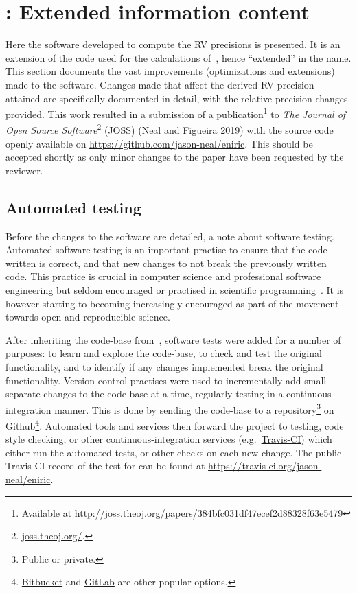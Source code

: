 
\section{\eniric{}: Extended \nir{} information content}
\label{sec:eniric}
Here the software developed to compute the {RV} precisions is presented.
It is an extension of the code used for the calculations of~\citet{figueira_radial_2016}, hence ``extended'' in the name.
This section documents the vast improvements (optimizations and extensions) made to the software.
Changes made that affect the derived {RV} precision attained are specifically documented in detail, with the relative precision changes provided.
This work resulted in a submission of a publication\footnote{Available at \href{http://joss.theoj.org/papers/384bfc031df47ecef2d88328f63e5479}{http://joss.theoj.org/papers/384bfc031df47ecef2d88328f63e5479}} to \emph{The Journal of Open Source Software}\footnote{\href{http://joss.theoj.org/}{joss.theoj.org/}.} (JOSS) (Neal and Figueira 2019) with the source code openly available on \href{Github}{https://github.com/jason-neal/eniric}.
This should be accepted shortly as only minor changes to the paper have been requested by the reviewer.


\subsection{Automated testing}
\label{subsec:automated_testing}
Before the changes to the software are detailed, a note about software testing.
Automated software testing is an important practise to ensure that the code written is correct, and that new changes to not break the previously written code.
This practice is crucial in computer science and professional software engineering but seldom encouraged or practised in scientific programming~\citep{storer_bridging_2017}.
It is however starting to becoming increasingly encouraged as part of the movement towards open and reproducible science.

After inheriting the code-base from~\citet{figueira_radial_2016}, software tests were added for a number of purposes: to learn and explore the code-base, to check and test the original functionality, and to identify if any changes implemented break the original functionality.
Version control practises were used to incrementally add small separate changes to the code base at a time, regularly testing in a continuous integration manner.
This is done by sending the code-base to a repository\footnote{Public or private.} on Github\footnote{\href{https://bitbucket.org}{Bitbucket} and \href{https://gitlab.com}{GitLab} are other popular options.}.
Automated tools and services then forward the project to testing, code style checking, or other continuous-integration services (e.g.\ \href{https://travis-ci.com}{Travis-CI}) which either run the automated tests, or other checks on each new change.
The public Travis-CI record of the test for \eniric{} can be found at \href{https://travis-ci.org/jason-neal/eniric}{https://travis-ci.org/jason-neal/eniric}.

